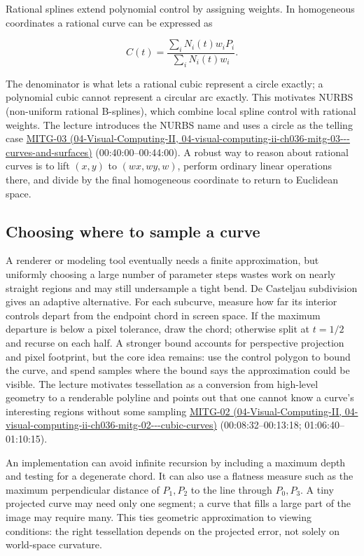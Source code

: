 Rational splines extend polynomial control by assigning weights. In homogeneous coordinates a rational curve can be expressed as

\[
C(t)=\frac{\sum_i N_i(t)w_iP_i}{\sum_i N_i(t)w_i}.
\]

The denominator is what lets a rational cubic represent a circle exactly; a polynomial cubic cannot represent a circular arc exactly. This motivates NURBS (non-uniform rational B-splines), which combine local spline control with rational weights. The lecture introduces the NURBS name and uses a circle as the telling case \href{../04-Visual-Computing-II/main.pdf\#nameddest=04-visual-computing-ii-ch036-mitg-03---curves-and-surfaces}{MITG-03 (04-Visual-Computing-II, 04-visual-computing-ii-ch036-mitg-03-\/-\/-curves-and-surfaces)} (00:40:00--00:44:00). A robust way to reason about rational curves is to lift \((x,y)\) to \((wx,wy,w)\), perform ordinary linear operations there, and divide by the final homogeneous coordinate to return to Euclidean space.

\subsection{Choosing where to sample a curve}\label{03-visual-computing-i-ch001-choosing-where-to-sample-a-curve}

A renderer or modeling tool eventually needs a finite approximation, but uniformly choosing a large number of parameter steps wastes work on nearly straight regions and may still undersample a tight bend. De Casteljau subdivision gives an adaptive alternative. For each subcurve, measure how far its interior controls depart from the endpoint chord in screen space. If the maximum departure is below a pixel tolerance, draw the chord; otherwise split at \(t=1/2\) and recurse on each half. A stronger bound accounts for perspective projection and pixel footprint, but the core idea remains: use the control polygon to bound the curve, and spend samples where the bound says the approximation could be visible. The lecture motivates tessellation as a conversion from high-level geometry to a renderable polyline and points out that one cannot know a curve's interesting regions without some sampling \href{../04-Visual-Computing-II/main.pdf\#nameddest=04-visual-computing-ii-ch036-mitg-02---cubic-curves}{MITG-02 (04-Visual-Computing-II, 04-visual-computing-ii-ch036-mitg-02-\/-\/-cubic-curves)} (00:08:32--00:13:18; 01:06:40--01:10:15).

An implementation can avoid infinite recursion by including a maximum depth and testing for a degenerate chord. It can also use a flatness measure such as the maximum perpendicular distance of \(P_1,P_2\) to the line through \(P_0,P_3\). A tiny projected curve may need only one segment; a curve that fills a large part of the image may require many. This ties geometric approximation to viewing conditions: the right tessellation depends on the projected error, not solely on world-space curvature.

